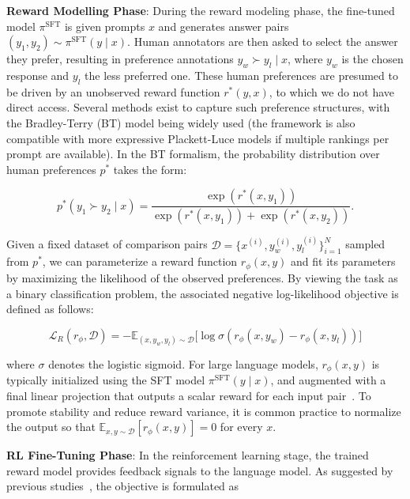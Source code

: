 \textbf{Reward Modelling Phase}: During the reward modeling phase, the fine-tuned model $\pi^\text{SFT}$ is given prompts $x$ and generates answer pairs $(y_1, y_2)\sim \pi^\text{SFT}(y \mid x)$. Human annotators are then asked to select the answer they prefer, resulting in preference annotations $y_w\succ y_l \mid x$, where $y_w$ is the chosen response and $y_l$ the less preferred one. These human preferences are presumed to be driven by an unobserved reward function $r^*(y, x)$, to which we do not have direct access. Several methods exist to capture such preference structures, with the Bradley-Terry (BT) model \cite{bradley1952rankanalysis} being widely used (the framework is also compatible with more expressive Plackett-Luce models \citep{plackett1975analysis, luce2012individual} if multiple rankings per prompt are available). In the BT formalism, the probability distribution over human preferences $p^*$ takes the form:

\begin{equation}\label{eq:bradley-terry}
    p^*(y_1\succ y_2 \mid x)=\frac{\exp\left(r^*(x, y_1)\right)}{\exp\left(r^*(x, y_1)\right) + \exp\left(r^*(x, y_2)\right)}.
\end{equation}

Given a fixed dataset of comparison pairs $\mathcal{D}=\bigl\{x^{(i)}, y_w^{(i)}, y_l^{(i)}\bigr\}_{i=1}^N$ sampled from $p^*$, we can parameterize a reward function $r_{\phi}(x, y)$ and fit its parameters by maximizing the likelihood of the observed preferences. By viewing the task as a binary classification problem, the associated negative log-likelihood objective is defined as follows:

\begin{equation}\label{eq:reward_model}
    \mathcal{L}_R(r_{\phi}, \mathcal{D}) = -\mathbb{E}_{(x, y_w, y_l)\sim \mathcal{D}}\bigl[\log \sigma(r_{\phi}(x, y_w)- r_{\phi}(x, y_l))\bigr]
\end{equation}

where $\sigma$ denotes the logistic sigmoid. For large language models, $r_{\phi}(x, y)$ is typically initialized using the SFT model $\pi^\text{SFT}(y \mid x)$, and augmented with a final linear projection that outputs a scalar reward for each input pair~\cite{ziegler2020finetuning}. To promote stability and reduce reward variance, it is common practice to normalize the output so that $\mathbb{E}_{x,y\sim \mathcal{D}}\left[r_\phi(x, y)\right] = 0$ for every $x$.

\textbf{RL Fine-Tuning Phase}: In the reinforcement learning stage, the trained reward model provides feedback signals to the language model. As suggested by previous studies~\citep{jaques2017sequence, jaques2020human}, the objective is formulated as

